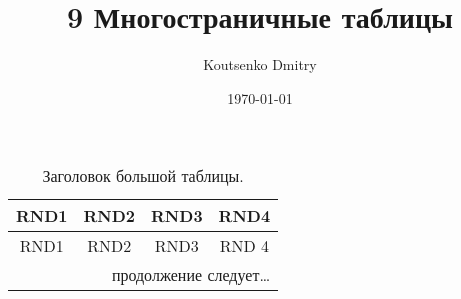 \documentclass[a4paper,12pt]{article}                       %
\title{9 Многостраничные таблицы}
\author{Koutsenko Dmitry}
\date{\today}
\begin{document}

\maketitle

\begin{longtable}{|c|c|c|c|}
    \caption{Заголовок большой таблицы.}                          \\
    \hline
    \textbf{RND1} & \textbf{RND2} & \textbf{RND3} & \textbf{RND4} \\
    \hline
    \endfirsthead
    \hline
    RND1          & RND2          & RND3          & RND 4         \\ \hline
    \endhead
    \hline
    \multicolumn{4}{r}{продолжение следует\ldots}\
    \endfoot
    \hline
    \endlastfoot


\end{longtable}
\end{document}
